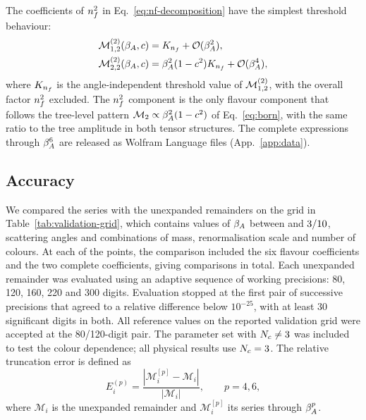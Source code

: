 The coefficients of $n_f^2$ in Eq.~\eqref{eq:nf-decomposition}
have the simplest threshold behaviour:
\begin{align}
 \mathcal{M}^{(2)}_{1,2}(\beta_A,c)&=K_{n_f}+\mathcal{O}(\beta_A^2),
 \label{eq:nf2-leading-one}\\
 \mathcal{M}^{(2)}_{2,2}(\beta_A,c)&=\beta_A^2(1-c^2)K_{n_f}+\mathcal{O}(\beta_A^4),
 \label{eq:nf2-leading-two}
\end{align}
where $K_{n_f}$ is the angle-independent threshold value of
$\mathcal{M}^{(2)}_{1,2}$, with the overall factor $n_f^2$ excluded.
The $n_f^2$ component is the only flavour component that follows the tree-level pattern $\mathcal M_2\propto\beta_A^2(1-c^2)$ of Eq.~\eqref{eq:born}, with the same ratio to the tree amplitude in both tensor structures. The complete expressions through $\beta_A^6$ are released as Wolfram Language files (App.~\ref{app:data}).

\subsection{Accuracy}
\label{sec:validation}

We compared the series with the unexpanded remainders on
the grid in Table~\ref{tab:validation-grid}, which contains
\BetaPointCount{} values of $\beta_A$ between \ValBetaMin{}
and $3/10$, \AnglePointCount{} scattering angles
and \ParameterSetCount{} combinations of mass,
renormalisation scale and number of colours.
At each of the \GridPointCount{} points, the comparison
included the six flavour coefficients and the two complete
coefficients, giving \ValidationRows{} comparisons in total.
Each unexpanded remainder was evaluated using an adaptive sequence
of working precisions: 80, 120, 160, 220 and 300 digits.
Evaluation stopped at the first pair of successive precisions
that agreed to a relative difference below $10^{-25}$,
with at least 30 significant digits in both. All reference values
on the reported validation grid were accepted at the 80/120-digit pair.
The parameter set with $N_c\neq3$ was
included to test the colour dependence; all physical
results use $N_c=3$.
The relative truncation error is defined as
\begin{equation}
 E_i^{(p)}
 =
 \frac{\left|\mathcal M_i^{[p]}-\mathcal M_i\right|}
      {\left|\mathcal M_i\right|},
 \qquad p=4,6,
 \label{eq:relative-error}
\end{equation}
where $\mathcal M_i$ is the unexpanded remainder and $\mathcal M_i^{[p]}$ its series through $\beta_A^p$.

